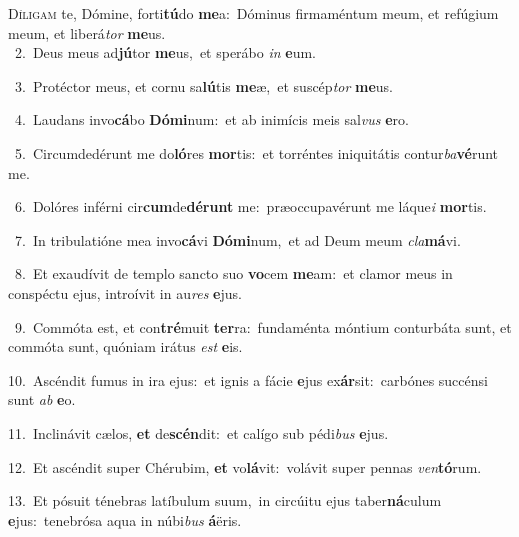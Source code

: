 \lettrine{\initial\textcolor{\initialcolor}{D}}{íligam} te, Dómine, forti\-\textbf{tú}\-do \textbf{me}\-a:~\star Dóminus firmaméntum meum, et refúgium meum, et liberá\textit{tor} \textbf{me}\-us.\\
{\numbfont\textcolor{\numbcolor}{~2.}}~Deus meus ad\-\textbf{jú}\-tor \textbf{me}\-us,~\star et sperábo \textit{in} \textbf{e}\-um.\par
{\numbfont\textcolor{\numbcolor}{~3.}}~Protéctor meus, et cornu sa\-\textbf{lú}\-tis \textbf{me}\-æ,~\star et suscép\textit{tor} \textbf{me}\-us.\par
{\numbfont\textcolor{\numbcolor}{~4.}}~Laudans invo\-\textbf{cá}\-bo \textbf{Dó}\-\textbf{mi}num:~\star et ab inimícis meis sal\textit{vus} \textbf{e}\-ro.\par
{\numbfont\textcolor{\numbcolor}{~5.}}~Circumdedérunt me do\-\textbf{ló}\-res \textbf{mor}\-tis:~\star et torréntes iniquitátis contur\-\textit{ba}\-\textbf{vé}runt me.\par
{\numbfont\textcolor{\numbcolor}{~6.}}~Dolóres inférni cir\-\textbf{cum}\-de\-\textbf{dé}\-\textbf{runt} me:~\star præoccupavérunt me láque\textit{i} \textbf{mor}\-tis.\par
{\numbfont\textcolor{\numbcolor}{~7.}}~In tribulatióne mea invo\-\textbf{cá}\-vi \textbf{Dó}\-\textbf{mi}num,~\star et ad Deum meum \textit{cla}\-\textbf{má}vi.\par
{\numbfont\textcolor{\numbcolor}{~8.}}~Et exaudívit de templo sancto suo \textbf{vo}\-cem \textbf{me}\-am:~\star et clamor meus in conspéctu ejus, introívit in au\textit{res} \textbf{e}\-jus.\par
{\numbfont\textcolor{\numbcolor}{~9.}}~Commóta est, et con\-\textbf{tré}\-muit \textbf{ter}\-ra:~\star fundaménta móntium conturbáta sunt, et commóta sunt, quóniam irátus \textit{est} \textbf{e}\-is.\par
{\numbfont\textcolor{\numbcolor}{10.}}~Ascéndit fumus in ira ejus:~\dagger et ignis a fácie \textbf{e}\-jus ex\-\textbf{ár}\-sit:~\star carbónes succénsi sunt \textit{ab} \textbf{e}\-o.\par
{\numbfont\textcolor{\numbcolor}{11.}}~Inclinávit cælos, \textbf{et} de\-\textbf{scén}\-dit:~\star et calígo sub pédi\textit{bus} \textbf{e}\-jus.\par
{\numbfont\textcolor{\numbcolor}{12.}}~Et ascéndit super Chérubim, \textbf{et} vo\-\textbf{lá}\-vit:~\star volávit super pennas \textit{ven}\-\textbf{tó}rum.\par
{\numbfont\textcolor{\numbcolor}{13.}}~Et pósuit ténebras latíbulum suum,~\dagger in circúitu ejus taber\-\textbf{ná}\-culum \textbf{e}\-jus:~\star tenebrósa aqua in núbi\textit{bus} \textbf{á}\-ëris.\par
